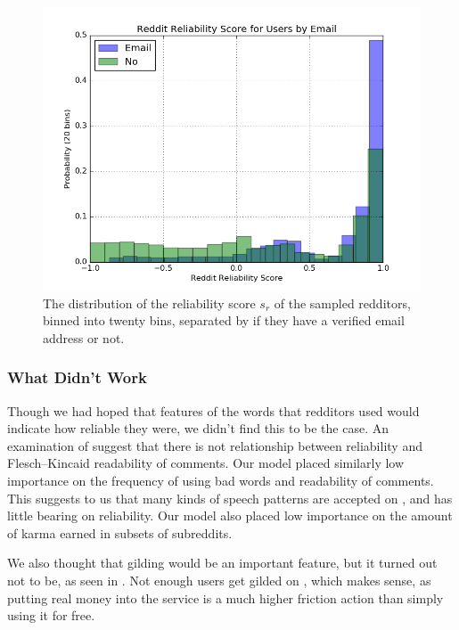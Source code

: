 \begin{figure}[tb]
    \centering
    \includegraphics[width=\linewidth]{../src/do_regression/figs/data_20_email.png}
    \caption{The distribution of the reliability score $s_r$ of the sampled redditors, binned into twenty bins, separated by if they have a verified email address or not.}
    \label{fig:data_20_email}
\end{figure}


\subsubsection{What Didn't Work} %
\label{ssub:what_didn_t_work}

Though we had hoped that features of the words that redditors used would
indicate how reliable they were, we didn't find this to be the case. An
examination of  suggest that there is not
relationship between reliability and Flesch--Kincaid readability of comments.
Our model placed similarly low importance on the frequency of using bad words
and readability of comments. This suggests to us that many kinds of speech
patterns are accepted on \reddit{}, and has little bearing on reliability. Our
model also placed low importance on the amount of karma earned in subsets of
subreddits.

We also thought that gilding would be an important feature, but it turned out
not to be, as seen in . Not enough users get gilded
on \reddit{}, which makes sense, as putting real money into the service is a
much higher friction action than simply using it for free.

